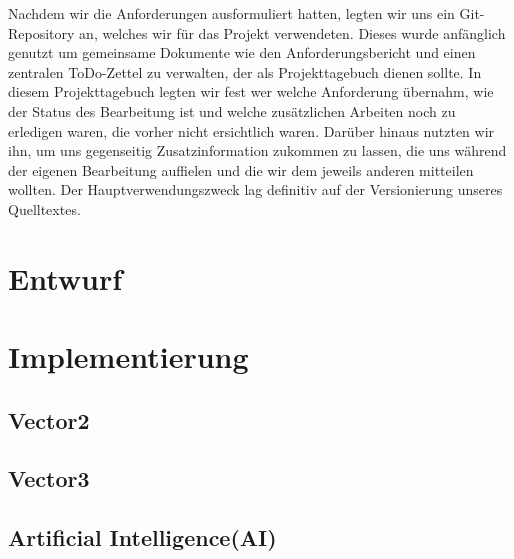 \documentclass[a4paper]{scrartcl}
\begin{document}
Nachdem wir die Anforderungen ausformuliert hatten, legten wir uns ein Git-Repository an, welches wir für das Projekt verwendeten. Dieses wurde anfänglich genutzt um gemeinsame Dokumente wie den Anforderungsbericht und einen zentralen ToDo-Zettel zu verwalten, der als Projekttagebuch dienen sollte. In diesem Projekttagebuch legten wir fest wer welche Anforderung übernahm, wie der Status des Bearbeitung ist und welche zusätzlichen Arbeiten noch zu erledigen waren, die vorher nicht ersichtlich waren. Darüber hinaus nutzten wir ihn, um uns gegenseitig Zusatzinformation zukommen zu lassen, die uns während der eigenen Bearbeitung auffielen und die wir dem jeweils anderen mitteilen wollten. Der Hauptverwendungszweck lag definitiv auf der Versionierung unseres Quelltextes.

\section{Entwurf}\label{ch:Entwurf}


\section{Implementierung}\label{ch:Implementierung}



\subsection{Vector2}\label{ch:Vector2}
\subsection{Vector3}\label{ch:Vector3}
\subsection{Artificial Intelligence(AI)}\label{ch:AI}
\end{document}
